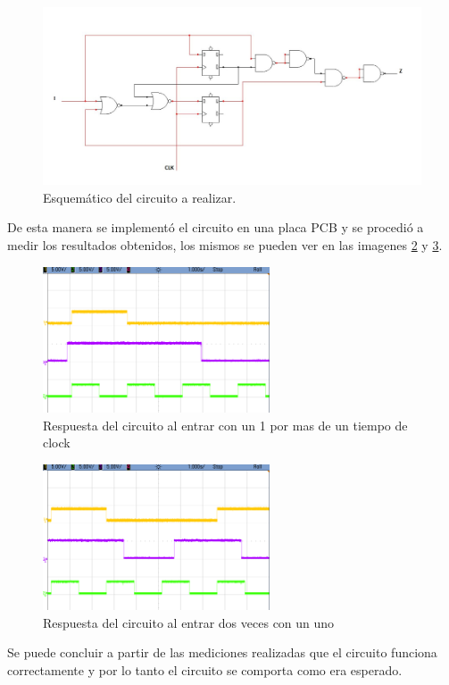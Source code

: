 %
%
\begin{figure}[H]
    \centering
    \includegraphics[width=1\textwidth]{figs/Ej3/circ_ej3.JPG} %
        \caption{Esquemático del circuito a realizar.}
    \label{ej3_circuito}
\end{figure}
%
De esta manera se implementó el circuito en una placa PCB y se procedió a medir los resultados obtenidos, los mismos se pueden ver en las imagenes \ref{ej3_res1} y \ref{ej3_res2}.
%
\begin{figure}[H]
    \centering
    \includegraphics[width=0.6\textwidth]{figs/Ej3/scope_19.png} %
        \caption{Respuesta del circuito al entrar con un 1 por mas de un tiempo de clock}
    \label{ej3_res1}
\end{figure}
%
%
\begin{figure}[H]
    \centering
    \includegraphics[width=0.6\textwidth]{figs/Ej3/scope_20.png} %
        \caption{Respuesta del circuito al entrar dos veces con un uno}
    \label{ej3_res2}
\end{figure}
%
Se puede concluir a partir de las mediciones realizadas que el circuito funciona correctamente y por lo tanto el circuito se comporta como era esperado.
